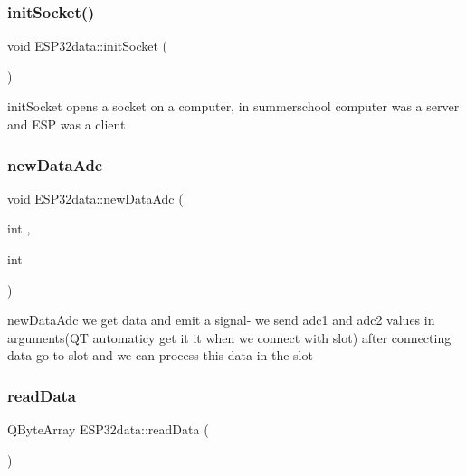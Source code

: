 \mbox{\label{class_e_s_p32data_a48f03ba841041fd88b8c60659ef36064}} 
\subsubsection{\texorpdfstring{init\+Socket()}{initSocket()}}
{\footnotesize\ttfamily void E\+S\+P32data\+::init\+Socket (\begin{DoxyParamCaption}{ }\end{DoxyParamCaption})}



init\+Socket opens a socket on a computer, in summerschool computer was a server and E\+SP was a client 

\mbox{\label{class_e_s_p32data_ade36e3d9b929614a79d1a24491c18185}} 
\subsubsection{\texorpdfstring{new\+Data\+Adc}{newDataAdc}}
{\footnotesize\ttfamily void E\+S\+P32data\+::new\+Data\+Adc (\begin{DoxyParamCaption}\item[{int}]{,  }\item[{int}]{ }\end{DoxyParamCaption})\hspace{0.3cm}{\ttfamily [signal]}}



new\+Data\+Adc we get data and emit a signal-\/ we send adc1 and adc2 values in arguments(\+Q\+T automaticy get it it when we connect with slot) after connecting data go to slot and we can process this data in the slot 

\mbox{\label{class_e_s_p32data_aacb815132c382980c4d850f099e26ea6}} 
\subsubsection{\texorpdfstring{read\+Data}{readData}}
{\footnotesize\ttfamily Q\+Byte\+Array E\+S\+P32data\+::read\+Data (\begin{DoxyParamCaption}{ }\end{DoxyParamCaption})\hspace{0.3cm}{\ttfamily [slot]}}



